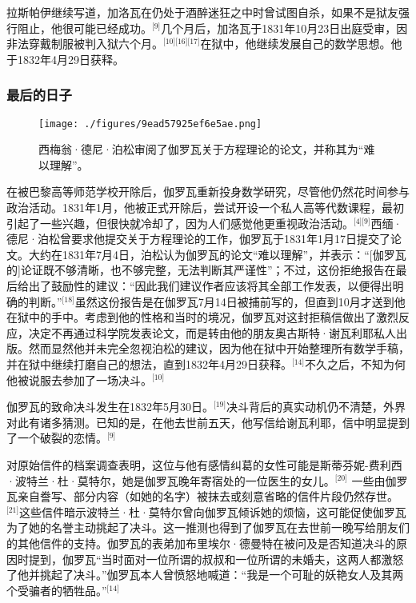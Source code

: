 拉斯帕伊继续写道，加洛瓦在仍处于酒醉迷狂之中时曾试图自杀，如果不是狱友强行阻止，他很可能已经成功。\(^\text{[9]}\)几个月后，加洛瓦于1831年10月23日出庭受审，因非法穿戴制服被判入狱六个月。\(^\text{[10][16][17]}\)在狱中，他继续发展自己的数学思想。他于1832年4月29日获释。
\subsubsection{最后的日子}
\begin{figure}[ht]
\centering
\texttt{[image: ./figures/9ead57925ef6e5ae.png]}
\caption{西梅翁·德尼·泊松审阅了伽罗瓦关于方程理论的论文，并称其为“难以理解”。} \label{fig_AWLS_4}
\end{figure}
在被巴黎高等师范学校开除后，伽罗瓦重新投身数学研究，尽管他仍然花时间参与政治活动。1831年1月，他被正式开除后，尝试开设一个私人高等代数课程，最初引起了一些兴趣，但很快就冷却了，因为人们感觉他更重视政治活动。\(^\text{[4][9]}\)西缅·德尼·泊松曾要求他提交关于方程理论的工作，伽罗瓦于1831年1月17日提交了论文。大约在1831年7月4日，泊松认为伽罗瓦的论文“难以理解”，并表示：“[伽罗瓦的]论证既不够清晰，也不够完整，无法判断其严谨性”；不过，这份拒绝报告在最后给出了鼓励性的建议：“因此我们建议作者应该将其全部工作发表，以便得出明确的判断。”\(^\text{[18]}\)虽然这份报告是在伽罗瓦7月14日被捕前写的，但直到10月才送到他在狱中的手中。考虑到他的性格和当时的境况，伽罗瓦对这封拒稿信做出了激烈反应，决定不再通过科学院发表论文，而是转由他的朋友奥古斯特·谢瓦利耶私人出版。然而显然他并未完全忽视泊松的建议，因为他在狱中开始整理所有数学手稿，并在狱中继续打磨自己的想法，直到1832年4月29日获释。\(^\text{[14]}\)不久之后，不知为何他被说服去参加了一场决斗。\(^\text{[10]}\)

伽罗瓦的致命决斗发生在1832年5月30日。\(^\text{[19]}\)决斗背后的真实动机仍不清楚，外界对此有诸多猜测。已知的是，在他去世前五天，他写信给谢瓦利耶，信中明显提到了一个破裂的恋情。\(^\text{[9]}\)

对原始信件的档案调查表明，这位与他有感情纠葛的女性可能是斯蒂芬妮-费利西·波特兰·杜·莫特尔，她是伽罗瓦晚年寄宿处的一位医生的女儿。\(^\text{[20]}\) 一些由伽罗瓦亲自誊写、部分内容（如她的名字）被抹去或刻意省略的信件片段仍然存世。\(^\text{[21]}\)这些信件暗示波特兰·杜·莫特尔曾向伽罗瓦倾诉她的烦恼，这可能促使伽罗瓦为了她的名誉主动挑起了决斗。这一推测也得到了伽罗瓦在去世前一晚写给朋友们的其他信件的支持。伽罗瓦的表弟加布里埃尔·德曼特在被问及是否知道决斗的原因时提到，伽罗瓦“当时面对一位所谓的叔叔和一位所谓的未婚夫，这两人都激怒了他并挑起了决斗。”伽罗瓦本人曾愤怒地喊道：“我是一个可耻的妖艳女人及其两个受骗者的牺牲品。”\(^\text{[14]}\)


